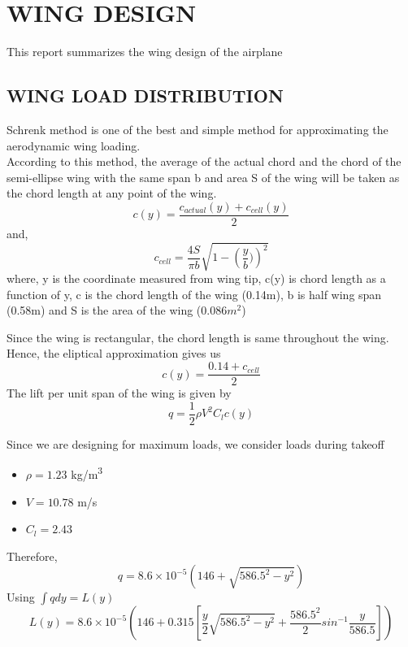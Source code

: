 \chapter{WING DESIGN}
\label{ch2}
This report summarizes the wing design of the airplane

\section{WING LOAD DISTRIBUTION}
\label{s:ch2_wingdesign}
Schrenk method is one of the best and simple method for approximating the aerodynamic wing 
loading.
\\
According to this method, the average of the actual chord and the chord of the semi-ellipse wing 
with the same span b and area S of the wing will be taken as the chord length at any point of the 
wing.
\begin{equation} c(y) = \frac{c_{actual}(y) + c_{cell}(y)}{2} \end{equation}
and,  \[ c_{cell} = \frac{4S}{\pi b}\sqrt{1 - \left(\frac{y}{b})\right)^2} \]
where, y is the coordinate measured from wing tip, c(y) is chord length as a function of y, c is the chord length of the wing (0.14m), b is half wing span (0.58m) and S is the area of the wing (0.086$m^2$)

Since the wing is rectangular, the chord length is same throughout the wing. Hence, the eliptical approximation gives us
\begin{equation} c(y) = \frac{0.14 + c_{cell}}{2} \end{equation}
The lift per unit span of the wing is given by
\begin{equation} q = \frac{1}{2}\rho V^2C_lc(y) \end{equation}

\pagebreak
Since we are designing for maximum loads, we consider loads during takeoff
\begin{itemize}
\item $\rho = 1.23$ kg/m\textsuperscript{3}
\item $V = 10.78$  m/s
\item $C_l = 2.43$
\end{itemize}
Therefore,
\begin{equation} q = 8.6\times10^{-5}(146 + \sqrt{586.5^2 - y^2}) \end{equation}
Using $\int{qdy} = L(y)$
\begin{equation}
L(y) = 8.6\times10^{-5}\left(146 + 0.315\left[\frac{y}{2}\sqrt{586.5^2 - y^2} + \frac{586.5^2}{2}sin^{-1}\frac{y}{586.5}\right]\right)
\end{equation}

